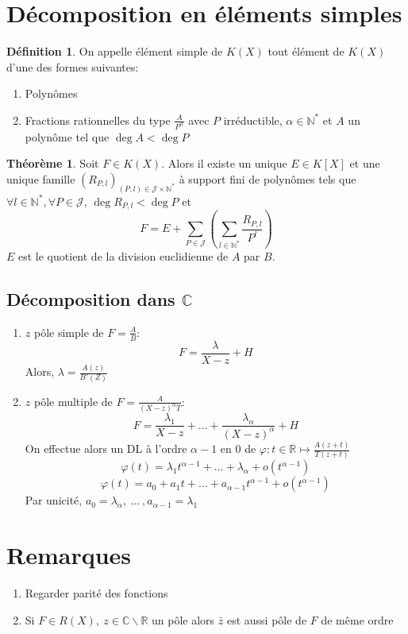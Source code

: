 \documentclass[fleqn]{article}
\theoremstyle{definition} \newtheorem*{defi}{D\'efinition}
\theoremstyle{definition} \newtheorem*{theo}{Th\'eor\`eme}
\theoremstyle{definition} \newtheorem*{coro}{Corollaire}
\theoremstyle{definition} \newtheorem*{nota}{Notation}
\theoremstyle{remark} \newtheorem*{rqs}{Remarques}
\theoremstyle{definition} \newtheorem*{prop}{Propri\'et\'e}
\begin{document}
\section{D\'ecomposition en \'el\'ements simples}
\begin{defi}
	On appelle \'el\'ement simple de $K(X)$ tout \'el\'ement de $K(X)$ d'une des formes suivantes:
	\begin{enumerate}
		\item Polyn\^omes
		\item Fractions rationnelles du type $\frac{A}{P^\alpha}$ avec $P$ irr\'eductible, $\alpha \in \mathbb{N}^*$ et $A$ un polyn\^ome tel que
			$\deg A < \deg P$
	\end{enumerate}
\end{defi}

\begin{theo}
	Soit $F \in K(X)$. Alors il existe un unique $E \in K[X]$ et une unique famille $(R_{P,l})_{(P,l) \in \mathcal{J} \times \mathbb{N}^*}$
	\`a support fini de polyn\^omes tels que \mbox{$\forall l \in \mathbb{N}^*, \forall P \in \mathcal{J}$}, $\deg R_{P,l} < \deg P$ et
	\[F = E + \sum_{P \in \mathcal{J}} \left(\sum_{l \in \mathbb{N}^*} \frac{R_{P,l}}{P^l}\right)\]
	$E$ est le quotient de la division euclidienne de $A$ par $B$.
\end{theo}

\subsection{D\'ecomposition dans $\mathbb{C}$}
\begin{enumerate}
	\item $z$ p\^ole simple de $F=\frac{A}{B}$:
		\[F = \frac{\lambda}{X -z} + H\]
		Alors, $\lambda = \frac{A(z)}{B'(Z)}$
	\item $z$ p\^ole multiple de $F= \frac{A}{(X-z)^\alpha T}$:
		\[F = \frac{\lambda_1}{X-z} + \hdots + \frac{\lambda_\alpha}{(X-z)^\alpha} + H\]
		On effectue alors un DL \`a l'ordre $\alpha -1$ en $0$ de $\varphi: t\in \mathbb{R} \mapsto \frac{A(z+t)}{T(z+t)}$
		\[\varphi(t) = \lambda_1 t^{\alpha -1} + \hdots + \lambda_\alpha + o(t^{\alpha -1})\]
		\[\varphi(t) = a_0 + a_1 t + \hdots + a_{\alpha -1} t^{\alpha -1} + o(t^{\alpha -1})\]
		Par unicit\'e, $a_0 = \lambda_\alpha,\ \hdots\ , a_{\alpha-1} = \lambda_1$
\end{enumerate}

\section{Remarques}
\begin{enumerate}
	\item Regarder parit\'e des fonctions
	\item Si $F \in R(X),\ z \in \mathbb{C} \backslash \mathbb{R}$ un p\^ole alors $\bar{z}$ est aussi p\^ole de $F$ de m\^eme ordre
\end{enumerate}
\end{document}
